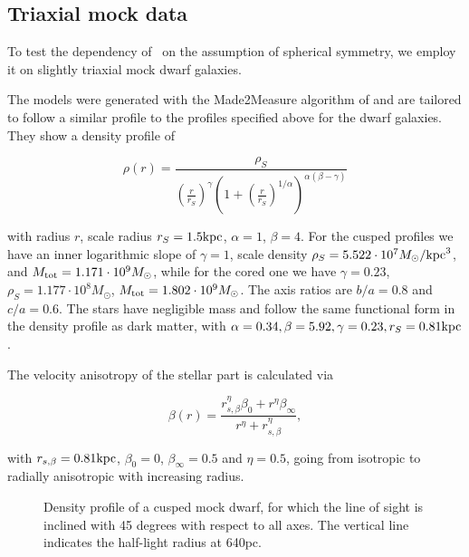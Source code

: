\subsection{Triaxial mock data}

To test the dependency of \GravImage\ on the
assumption of spherical symmetry, we employ it on
slightly triaxial mock dwarf galaxies.

The models were generated with the Made2Measure
algorithm of \cite{Dehnen2009} and are tailored to
follow a similar profile to the profiles specified
above for the dwarf galaxies. They show a density
profile of

\begin{equation}
    \rho(r)=\frac{\rho_S}{\left(\frac{r}{r_S}\right)^\gamma\left(1+\left(\frac{r}{r_S}\right)^{1/\alpha}\right)^{\alpha(\beta-\gamma)}}
\end{equation}

with radius $r$, scale radius $r_S=1.5\mathrm{kpc}$,
$\alpha=1$, $\beta=4$. For the cusped profiles we
have an inner logarithmic slope of $\gamma=1$,
scale density $\rho_S=5.522\cdot
10^7M_\odot/\mathrm{kpc}^3$, and
$M_{\mathrm{tot}}=1.171\cdot10^9M_\odot$, while for the
cored one we have $\gamma=0.23$,
$\rho_S=1.177\cdot10^8M_\odot$,
$M_{\mathrm{tot}}=1.802\cdot10^9M_\odot$. The axis ratios
are $b/a=0.8$ and $c/a=0.6$. The stars have
negligible mass and follow the same functional
form in the density profile as dark matter, with
$\alpha=0.34, \beta=5.92, \gamma=0.23,
r_S=0.81\mathrm{kpc}$.

The velocity anisotropy of the stellar part is calculated via

\begin{equation}
    \beta(r)=\frac{r_{s,\beta}^\eta \beta_0+r^\eta \beta_\infty}{r^\eta+r_{s,\beta}^\eta},
\end{equation}

with $r_{s,\beta}=0.81\mathrm{kpc}$, $\beta_0=0$, $\beta_\infty=0.5$ and
$\eta=0.5$, going from isotropic to radially anisotropic with
increasing radius.

\begin{figure*}
    \begin{center}
        \hspace{-7mm}
        \caption{Density profile of a cusped
           mock dwarf, for which the line
          of sight is inclined with 45 degrees
          with respect to all axes. The vertical
          line indicates the half-light radius at
          640pc.}
        \label{fig:triax}
    \end{center}
\end{figure*}

